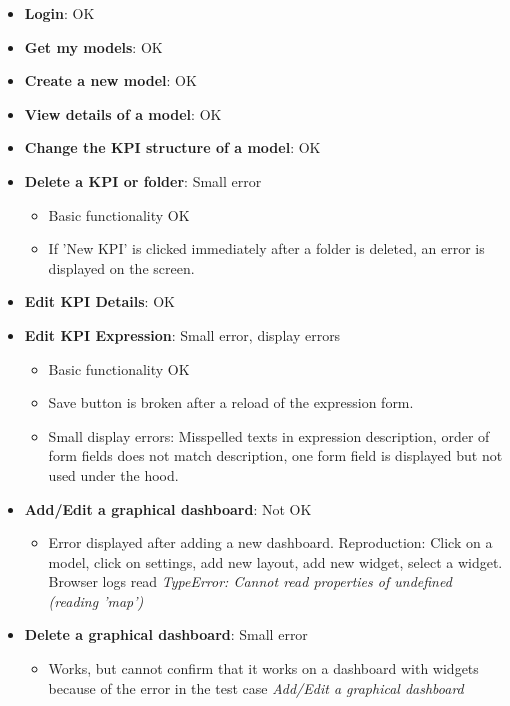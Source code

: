 \begin{itemize}
    \item \textbf{Login}: \textcolor{mutedGreen}{OK}
    \item \textbf{Get my models}: \textcolor{mutedGreen}{OK}
    \item \textbf{Create a new model}: \textcolor{mutedGreen}{OK}
    \item \textbf{View details of a model}: \textcolor{mutedGreen}{OK}
    \item \textbf{Change the KPI structure of a model}: \textcolor{mutedGreen}{OK}
    \item \textbf{Delete a KPI or folder}: \textcolor{mutedYellow}{Small error}
    \begin{itemize}
        \item Basic functionality OK
        \item If 'New KPI' is clicked immediately after a folder is deleted, an error is displayed on the screen.
    \end{itemize}
    \item \textbf{Edit KPI Details}: \textcolor{mutedGreen}{OK}
    \item \textbf{Edit KPI Expression}: \textcolor{mutedYellow}{Small error, display errors}
    \begin{itemize}
        \item Basic functionality OK
        \item Save button is broken after a reload of the expression form. 
        \item Small display errors: Misspelled texts in expression description, order of form fields does not match description, one form field is displayed but not used under the hood. 
    \end{itemize}
    \item \textbf{Add/Edit a graphical dashboard}: \textcolor{mutedPeach}{Not OK}
    \begin{itemize}
        \item Error displayed after adding a new dashboard. Reproduction: Click on a model, click on settings, add new layout, add new widget, select a widget. Browser logs read \textit{TypeError: Cannot read properties of undefined (reading 'map')}
    \end{itemize}
    \item \textbf{Delete a graphical dashboard}: \textcolor{mutedYellow}{Small error}
    \begin{itemize}
        \item Works, but cannot confirm that it works on a dashboard with widgets because of the error in the test case \textit{Add/Edit a graphical dashboard}

\end{itemize}
\end{itemize}
